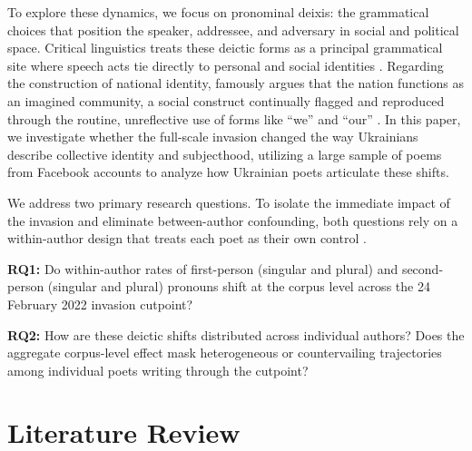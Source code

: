 \documentclass[12pt]{interact}
\theoremstyle{plain}%
\theoremstyle{definition}
\theoremstyle{remark}
\begin{document}
To explore these dynamics, we focus on pronominal deixis: the grammatical choices that position the speaker, addressee, and adversary in social and political space. Critical linguistics treats these deictic forms as a principal grammatical site where speech acts tie directly to personal and social identities \citep{muhlhausler1990pronouns}. Regarding the construction of national identity, \citet{anderson2006imagined} famously argues that the nation functions as an imagined community, a social construct continually flagged and reproduced through the routine, unreflective use of forms like ``we'' and ``our'' \citep{billig1995banal}. In this paper, we investigate whether the full-scale invasion changed the way Ukrainians describe collective identity and subjecthood, utilizing a large sample of poems from Facebook accounts to analyze how Ukrainian poets articulate these shifts.

We address two primary research questions. To isolate the immediate impact of the invasion and eliminate between-author confounding, both questions rely on a within-author design that treats each poet as their own control \citep{Hernn2016}.

\textbf{RQ1:} Do within-author rates of first-person (singular and plural) and second-person (singular and plural) pronouns shift at the corpus level across the 24 February 2022 invasion cutpoint?

\textbf{RQ2:} How are these deictic shifts distributed across individual authors? Does the aggregate corpus-level effect mask heterogeneous or countervailing trajectories among individual poets writing through the cutpoint?

\section{Literature Review}
\end{document}
